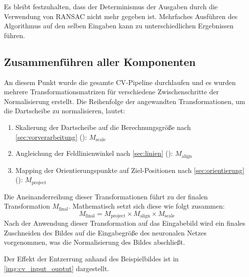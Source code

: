 Es bleibt festzuhalten, dass der Determinismus der Ausgaben durch die Verwendung von RANSAC nicht mehr gegeben ist. Mehrfaches Ausführen des Algorithmus auf den selben Eingaben kann zu unterschiedlichen Ergebnissen führen.

\subsection{Zusammenführen aller Komponenten}
\label{sec:zusammenfuehrung_aller_komponenten_cv}

An diesem Punkt wurde die gesamte CV-Pipeline durchlaufen und es wurden mehrere Transformationsmatrizen für verschiedene Zwischenschritte der Normalisierung erstellt. Die Reihenfolge der angewandten Transformationen, um die Dartscheibe zu normalisieren, lautet:

\begin{enumerate}
    \item Skalierung der Dartscheibe auf die Berechnungsgröße nach \autoref{sec:vorverarbeitung} (): $M_\text{scale}$
    \item Angleichung der Feldlinienwinkel nach \autoref{sec:linien} (): $M_\text{align}$
    \item Mapping der Orientierungspunkte auf Ziel-Positionen nach \autoref{sec:orientierung} (): $M_\text{project}$
\end{enumerate}

Die Aneinanderreihung dieser Transformationen führt zu der finalen Transformation $M_\text{final}$. Mathematisch setzt sich diese wie folgt zusammen:
\[ M_\text{final} = M_\text{project} \times M_\text{align} \times M_\text{scale} \]
Nach der Anwendung dieser Transformation auf das Eingabebild wird ein finales Zuschneiden des Bildes auf die Eingabegröße des neuronalen Netzes vorgenommen, was die Normalisierung des Bildes abschließt.

Der Effekt der Entzerrung anhand des Beispielbildes ist in \autoref{img:cv_input_ouptut} dargestellt.


